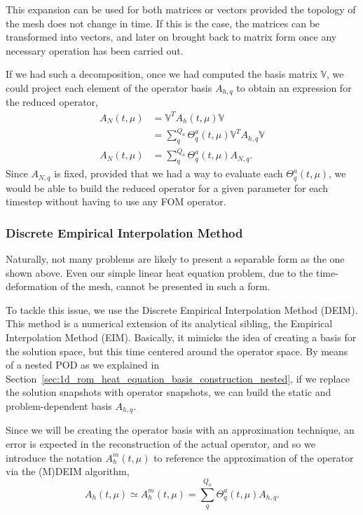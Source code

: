 \documentclass[../main.tex]{subfiles}
\newcommand{\rbV}{\ensuremath{\mathbb{V}}}
\newcommand{\rbVT}{\ensuremath{\rbV^T}}
\begin{document}
This expansion can be used for both matrices or vectors provided the topology of the mesh does not change in time.
If this is the case, the matrices can be transformed into vectors, and later on brought back to matrix form once any necessary operation has been carried out.

If we had such a decomposition, once we had computed the basis matrix \rbV, we could project each element of the operator basis $A_{h, q}$ to obtain an expression for the reduced operator, 
\begin{equation}
    \begin{split}
        A_N(t, \mu) &= \rbVT A_h(t, \mu) \rbV \\ 
        &= \sum_q^{Q_a} \Theta_q^a(t, \mu) \rbVT  A_{h, q} \rbV \\
        A_N(t, \mu) &= \sum_q^{Q_a} \Theta_q^a(t, \mu) A_{N,q}.
    \end{split}
\end{equation}
Since $A_{N, q}$ is fixed, provided that we had a way to evaluate each $\Theta_q^a(t, \mu)$, we would be able to build the reduced operator for a given parameter for each timestep without having to use any FOM operator. 

\subsubsection{Discrete Empirical Interpolation Method}
Naturally, not many problems are likely to present a separable form as the one shown above.
Even our simple linear heat equation problem, due to the time-deformation of the mesh, cannot be presented in such a form. 

To tackle this issue, we use the Discrete Empirical Interpolation Method (DEIM).
This method is a numerical extension of its analytical sibling, the Empirical Interpolation Method (EIM).
Basically, it mimicks the idea of creating a basis for the solution space, but this time centered around the operator space.
By means of a nested POD as we explained in Section~\ref{sec:1d_rom_heat_equation_basis_construction_nested}, if we replace the solution snapshots with operator snapshots, we can build the static and problem-dependent basis $A_{h,q}$.

Since we will be creating the operator basis with an approximation technique, an error is expected in the reconstruction of the actual operator, and so we introduce the notation $A_h^m(t, \mu)$ to reference the approximation of the operator via the (M)DEIM algorithm,
\begin{equation}
    \label{eq:1d_rom_heat_equation_system_approximation}
    A_h(t, \mu) \simeq A_h^m(t, \mu) = \sum_q^{Q_a} \Theta_q^a(t, \mu) A_{h,q}.
\end{equation}
\end{document}
